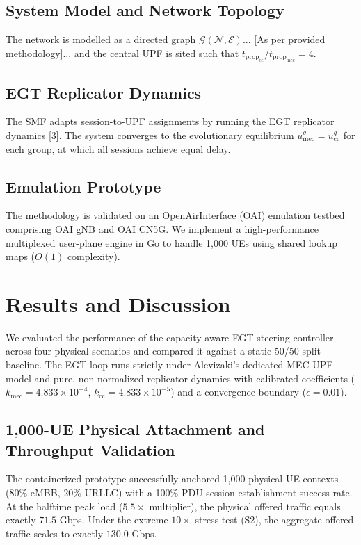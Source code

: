 \documentclass[conference]{IEEEtran}
\begin{document}
\subsection{System Model and Network Topology}
The network is modelled as a directed graph $\mathcal{G}(\mathcal{N},\mathcal{E})$... [As per provided methodology]... and the central UPF is sited such that $t_{\text{prop}_\text{cc}} / t_{\text{prop}_\text{mec}} = 4$.

\subsection{EGT Replicator Dynamics}
The SMF adapts session-to-UPF assignments by running the EGT replicator dynamics [3]. The system converges to the evolutionary equilibrium $u_\text{mec}^g = u_\text{cc}^g$ for each group, at which all sessions achieve equal delay.

\subsection{Emulation Prototype}
The methodology is validated on an OpenAirInterface (OAI) emulation testbed comprising OAI gNB and OAI CN5G. We implement a high-performance multiplexed user-plane engine in Go to handle 1,000 UEs using shared lookup maps ($O(1)$ complexity). 

\section{Results and Discussion}
\label{sec:results}

We evaluated the performance of the capacity-aware EGT steering controller across four physical scenarios and compared it against a static 50/50 split baseline. The EGT loop runs strictly under Alevizaki's dedicated MEC UPF model and pure, non-normalized replicator dynamics with calibrated coefficients ($k_{\text{mec}} = 4.833 \times 10^{-4}$, $k_{\text{cc}} = 4.833 \times 10^{-5}$) and a convergence boundary ($\epsilon = 0.01$).

\subsection{1,000-UE Physical Attachment and Throughput Validation}
The containerized prototype successfully anchored 1,000 physical UE contexts (80\% eMBB, 20\% URLLC) with a 100\% PDU session establishment success rate. At the halftime peak load ($5.5\times$ multiplier), the physical offered traffic equals exactly $71.5$ Gbps. Under the extreme $10\times$ stress test (S2), the aggregate offered traffic scales to exactly $130.0$ Gbps.
\end{document}
